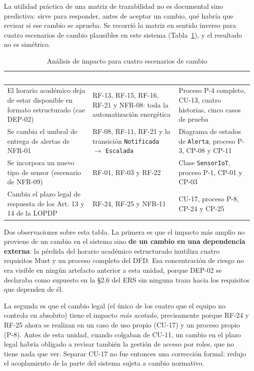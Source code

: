 La utilidad pr\'actica de una matriz de trazabilidad no es documental sino predictiva: sirve para responder, antes de aceptar un cambio, qu\'e habr\'ia que revisar si ese cambio se aprueba. Se recorri\'o la matriz en sentido inverso para cuatro escenarios de cambio plausibles en este sistema (Tabla~\ref{tab:impacto}), y el resultado no es sim\'etrico.

\begin{table}[H]
\centering
\small
\begin{tabular}{|p{4.0cm}|p{4.2cm}|p{4.4cm}|}
\hline
\cellcolor{sigagreen}\textcolor{white}{\textbf{Cambio hipot\'etico}} & \cellcolor{sigagreen}\textcolor{white}{\textbf{Alcance del impacto}} & \cellcolor{sigagreen}\textcolor{white}{\textbf{Artefactos a revisar}} \\ \hline
El horario acad\'emico deja de estar disponible en formato estructurado (cae DEP-02) & RF-13, RF-15, RF-16, RF-21 y NFR-08: toda la automatizaci\'on energ\'etica & Proceso P-4 completo, CU-13, cuatro historias, cinco casos de prueba \\ \hline
Se cambia el umbral de entrega de alertas de NFR-01 & RF-08, RF-11, RF-21 y la transici\'on \texttt{Notificada} $\rightarrow$ \texttt{Escalada} & Diagrama de estados de \texttt{Alerta}, proceso P-3, CP-08 y CP-11 \\ \hline
Se incorpora un nuevo tipo de sensor (escenario de NFR-09) & RF-01, RF-03 y RF-22 & Clase \texttt{SensorIoT}, proceso P-1, CP-01 y CP-03 \\ \hline
Cambia el plazo legal de respuesta de los Art. 13 y 14 de la LOPDP & RF-24, RF-25 y NFR-11 & CU-17, proceso P-8, CP-24 y CP-25 \\ \hline
\end{tabular}
\caption{An\'alisis de impacto para cuatro escenarios de cambio}
\label{tab:impacto}
\end{table}

Dos observaciones sobre esta tabla. La primera es que el impacto m\'as amplio no proviene de un cambio en el sistema sino \textbf{de un cambio en una dependencia externa}: la p\'erdida del horario acad\'emico estructurado inutiliza cuatro requisitos Must y un proceso completo del DFD. Esa concentraci\'on de riesgo no era visible en ning\'un artefacto anterior a esta unidad, porque DEP-02 se declaraba como supuesto en la \S2.6 del ERS sin ninguna traza hacia los requisitos que dependen de \'el.

La segunda es que el cambio legal (el \'unico de los cuatro que el equipo no controla en absoluto) tiene el impacto \emph{m\'as acotado}, precisamente porque RF-24 y RF-25 ahora se realizan en un caso de uso propio (CU-17) y un proceso propio (P-8). Antes de esta unidad, cuando col\-gaban de CU-11, un cambio en el plazo legal habr\'ia obligado a revisar tambi\'en la gesti\'on de acceso por roles, que no tiene nada que ver. Separar CU-17 no fue entonces una correcci\'on formal: redujo el acoplamiento de la parte del sistema sujeta a cambio normativo.

